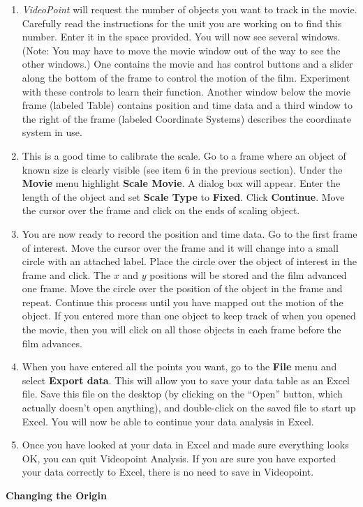 \begin{enumerate}

\item \textit{VideoPoint} will request the number of objects you want to
track in the movie. Carefully read the instructions for the unit you
are working on to find this number. Enter it in the space provided.
You will now see several windows. 
(Note: You may have to move the movie window out of the way to see the
other windows.) One contains the movie and has control
buttons and a slider along the bottom of the frame to control the
motion of the film. Experiment with these controls to learn their
function. Another window below the movie frame (labeled Table) contains position 
and time data and a third window to the right of the frame (labeled Coordinate
Systems) describes the coordinate system in use.
\item This is a good time to calibrate the scale. Go to a frame where an
object of known size is clearly visible (see item 6
in the previous
section). Under the \textbf{Movie} menu highlight \textbf{Scale Movie}.
A dialog box will appear. Enter the length of the object and set \textbf{Scale
Type} to \textbf{Fixed}. Click \textbf{Continue}. Move the cursor
over the frame and click on the ends of scaling object.
\item You are now ready to record the position and time data. Go to the
first frame of interest. Move the cursor over the frame and it will
change into a small circle with an attached label. Place the circle
over the object of interest in the frame and click. The $x$ and $y$ positions
will be stored and the film advanced one frame. Move the circle over
the position of the object in the frame and repeat. Continue this
process until you have mapped out the motion of the object. If you
entered more than one object to keep track of when you opened the
movie, then you will click on all those objects in each frame before
the film advances.
\item When you have entered all the points you want, go to the
\textbf{File} menu and select \textbf{Export data}.  This will
allow you to save your data table as an Excel file. 
Save this
file on the desktop (by clicking on the ``Open'' button, which actually
doesn't open anything), and double-click on the saved file to start up Excel.
You will now be able to continue your data analysis in Excel.

\item Once you have looked at your data in Excel and made sure everything
looks OK, you can quit Videopoint Analysis.  If you are sure you have
exported your data correctly to Excel, there is no need to save in Videopoint.

\end{enumerate}
\textbf{Changing the Origin} 

